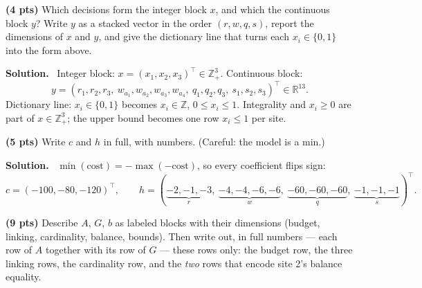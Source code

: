 \documentclass[10pt]{article}
\newenvironment{solution}
  {\par\smallskip\begingroup\color{solink}\textbf{Solution.}\ }
  {\endgroup\par}
\begin{document}
\begin{parts}
\item \textbf{(4 pts)} Which decisions form the integer block $x$, and which the
  continuous block $y$? Write $y$ as a stacked vector in the order $(r, w, q, s)$,
  report the dimensions of $x$ and $y$, and give the dictionary line that turns
  each $x_i \in \{0,1\}$ into the form above.

\begin{solution}
Integer block: $x = (x_1, x_2, x_3)^\top \in \mathbb{Z}^3_+$. Continuous block:
\[
  y = (r_1, r_2, r_3,\ w_{a_1}, w_{a_2}, w_{a_3}, w_{a_4},\ q_1, q_2, q_3,\ s_1, s_2, s_3)^\top
  \in \mathbb{R}^{13} .
\]
Dictionary line: $x_i \in \{0,1\}$ becomes $x_i \in \mathbb{Z}$, $0 \le x_i \le 1$.
Integrality and $x_i \ge 0$ are part of $x \in \mathbb{Z}^3_+$; the upper bound becomes
one row $x_i \le 1$ per site.
\end{solution}

\item \textbf{(5 pts)} Write $c$ and $h$ in full, with numbers. (Careful: the model
  is a min.)

\begin{solution}
$\min(\text{cost}) = -\max(-\text{cost})$, so every coefficient flips sign:
\[
  c = (-100, -80, -120)^\top, \qquad
  h = (\underbrace{-2, -1, -3}_{r},\ \underbrace{-4, -4, -6, -6}_{w},\
       \underbrace{-60, -60, -60}_{q},\ \underbrace{-1, -1, -1}_{s})^\top .
\]
\end{solution}

\item \textbf{(9 pts)} Describe $A$, $G$, $b$ as labeled blocks with their
  dimensions (budget, linking, cardinality, balance, bounds). Then write out, in
  full numbers --- each row of $A$ together with its row of $G$ --- these rows
  only: the budget row, the three linking rows, the cardinality row, and the
  \emph{two} rows that encode site 2's balance equality.


\end{parts}
\end{document}
